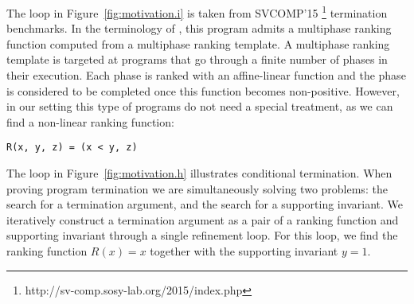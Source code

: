 \documentclass[preprint]{sigplanconf}
\theoremstyle{definition}
\begin{document}
The loop in Figure~\ref{fig:motivation.i} is taken from SVCOMP'15  \footnote{http://sv-comp.sosy-lab.org/2015/index.php} termination benchmarks.
In the terminology of \cite{DBLP:conf/tacas/LeikeH14}, this program admits a multiphase ranking function computed from a multiphase ranking template.
A multiphase ranking template is targeted at programs that go through a
finite number of phases in their execution. Each phase is ranked with
an affine-linear function and the phase is considered to be completed once this
function becomes non-positive.
However, in our setting this type of programs do not need a special treatment, as we can find a non-linear ranking function:
\begin{verbatim}
R(x, y, z) = (x < y, z)
\end{verbatim}

The loop in Figure~\ref{fig:motivation.h} illustrates conditional termination.
When proving program termination we are simultaneously solving two problems:
the search for a termination argument, and the search for a supporting invariant.
We iteratively construct a termination argument as a pair of a ranking function and supporting invariant through a single refinement loop.
For this loop, we find the ranking function $R(x) = x$ together with the supporting invariant $y=1$.
\end{document}
